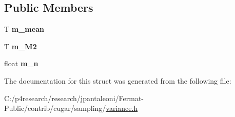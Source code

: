\subsection*{Public Members}
\begin{DoxyCompactItemize}
\item 
\mbox{\label{structcugar_1_1_variance__estimator_a71b5e2688ce3c516da87b22f513f9a88}} 
T {\bfseries m\+\_\+mean}
\item 
\mbox{\label{structcugar_1_1_variance__estimator_adb00cc00b55bb03c81d7a47d37d21162}} 
T {\bfseries m\+\_\+\+M2}
\item 
\mbox{\label{structcugar_1_1_variance__estimator_a1fcbc50804fcf300dea010cdcafd8df7}} 
float {\bfseries m\+\_\+n}
\end{DoxyCompactItemize}


The documentation for this struct was generated from the following file\+:\begin{DoxyCompactItemize}
\item 
C\+:/p4research/research/jpantaleoni/\+Fermat-\/\+Public/contrib/cugar/sampling/\hyperlink{variance_8h}{variance.\+h}\end{DoxyCompactItemize}
